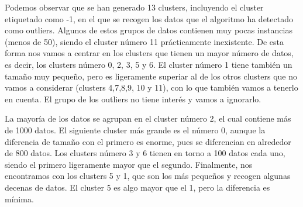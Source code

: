 \documentclass[a4paper,11pt]{book}
\begin{document}
Podemos observar que se han generado 13 clusters, incluyendo el cluster etiquetado como -1, en el que se recogen los datos que el algoritmo ha detectado como outliers. Algunos de estos grupos de datos contienen muy pocas instancias (menos de 50), siendo el cluster número 11 prácticamente inexistente. De esta forma nos vamos a centrar en los clusters que tienen un mayor número de datos, es decir, los clusters número 0, 2, 3, 5 y 6. El cluster número 1 tiene también un tamaño muy pequeño, pero es ligeramente superiar al de los otros clusters que no vamos a considerar (clusters 4,7,8,9, 10 y 11), con lo que también vamos a tenerlo en cuenta. El grupo de los outliers no tiene interés y vamos a ignorarlo. 

La mayoría de los datos se agrupan en el cluster número 2, el cual contiene más de 1000 datos. El siguiente cluster más grande es el número 0, aunque la diferencia de tamaño con el primero es enorme, pues se diferencian en alrededor de 800 datos. Los clusters número 3 y 6 tienen en torno a 100 datos cada uno, siendo el primero ligeramente mayor que el segundo.  Finalmente, nos encontramos con los clusters 5 y 1, que son los más pequeños y recogen algunas decenas de datos. El cluster 5 es algo mayor que el 1, pero la diferencia es mínima. 
\end{document}
